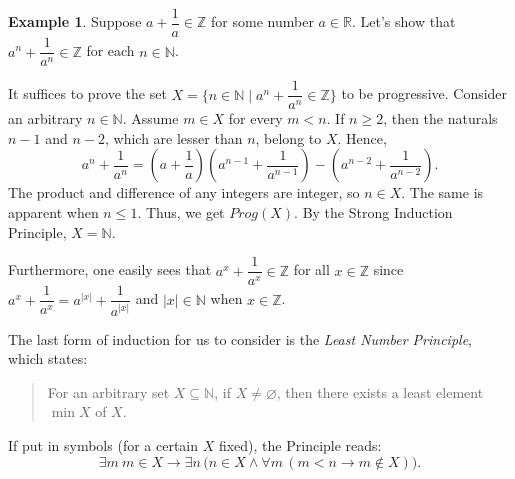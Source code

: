 \documentclass[12pt,notitlepage]{article}
\theoremstyle{plain}
\theoremstyle{definition}
\newtheorem{exm}[thm]{Example}
\theoremstyle{plain}
\newcommand{\N}{\mathbb{N}}
\newcommand{\sbs}{\subseteq}
\newcommand{\void}{\varnothing}
\newcommand{\1}{\mathbf{1}}
\newcommand{\0}{\mathbf{0}}
\newcommand{\mcomm}[1]{}
\begin{document}
\begin{exm}
Suppose $a + \dfrac{1}{a} \in \mathbb{Z}$ for some number $a \in \mathbb{R}$. Let's show that $a^n + \dfrac{1}{a^n} \in \mathbb{Z}$ for each $n \in \N$.

It suffices to prove the set $X = \{n \in \N \mid a^n + \dfrac{1}{a^n} \in \mathbb{Z}\}$ to be progressive. Consider an arbitrary $n \in \N$. Assume $m \in X$ for every $m < n$. If $n \geq 2$, then the naturals $n - 1$ and $n - 2$, which are lesser than $n$, belong to $X$. Hence,
$$a^n + \dfrac{1}{a^n} = \left (a + \dfrac{1}{a}\right)\left (a^{n-1} + \dfrac{1}{a^{n-1}} \right) - \left (a^{n-2} + \dfrac{1}{a^{n-2}} \right).$$
The product and difference of any integers are integer, so $n \in X$. The same is apparent when $n \leq 1$. Thus, we get $Prog(X)$. By the Strong Induction Principle, $X = \N$.

Furthermore, one easily sees that $a^x + \dfrac{1}{a^x} \in \mathbb{Z}$ for all $x \in \mathbb{Z}$ since $a^x + \dfrac{1}{a^x} = a^{|x|} + \dfrac{1}{a^{|x|}}$ and $|x| \in \N$ when $x \in \mathbb{Z}$.
\end{exm}

The last form of induction for us to consider is the \emph{Least Number Principle}, which states:
\begin{quote}
For an arbitrary set $X \sbs \N$, if $X \neq \void$, then there exists a least element $\min X$ of $X$.
\end{quote}
If put in symbols (for a certain $X$ fixed), the Principle reads:
$$\exists m\  m \in X \to \exists n\, \bigl(n \in X \wedge \forall m\, (m < n \to  m \notin X)\bigr).$$
\mcomm{As we have stated it, this is a `\emph{minimal} element principle' despite its traditional name. Although, for the linear ordering of $\N$, the choice between `minimal' and `least' does not logically matter, just the `minimal' form is equivalent to `strong' (or transfinite) induction for an arbitrary poset. Therefore we prefer to keep the traditional name for this general form of the principle. On the other hand, students may have questions on this ``misleading'' name when they have learned about minima and maxima in posets. The notation $\min X$ will be redefined later as well.}
\end{document}
